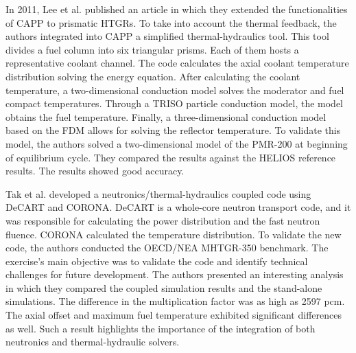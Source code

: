 In 2011, Lee et al. published an article \cite{lee_development_2011} in which they extended the functionalities of CAPP to prismatic \glspl{HTGR}.
To take into account the thermal feedback, the authors integrated into CAPP a simplified thermal-hydraulics tool.
This tool divides a fuel column into six triangular prisms.
Each of them hosts a representative coolant channel.
The code calculates the axial coolant temperature distribution solving the energy equation.
After calculating the coolant temperature, a two-dimensional conduction model solves the moderator and fuel compact temperatures.
Through a TRISO particle conduction model, the model obtains the fuel temperature.
Finally, a three-dimensional conduction model based on the \gls{FDM} allows for solving the reflector temperature.
To validate this model, the authors solved a two-dimensional model of the PMR-200 at beginning of equilibrium cycle.
They compared the results against the HELIOS reference results.
The results showed good accuracy.

Tak et al. \cite{tak_coupled_2016} developed a neutronics/thermal-hydraulics coupled code using DeCART \cite{kaeri_decart_2007} and CORONA.
DeCART is a whole-core neutron transport code, and it was responsible for calculating the power distribution and the fast neutron fluence.
CORONA calculated the temperature distribution.
To validate the new code, the authors conducted the OECD/NEA MHTGR-350 benchmark.
The exercise's main objective was to validate the code and identify technical challenges for future development.
The authors presented an interesting analysis in which they compared the coupled simulation results and the stand-alone simulations.
The difference in the multiplication factor was as high as 2597 pcm.
The axial offset and maximum fuel temperature exhibited significant differences as well.
Such a result highlights the importance of the integration of both neutronics and thermal-hydraulic solvers.

